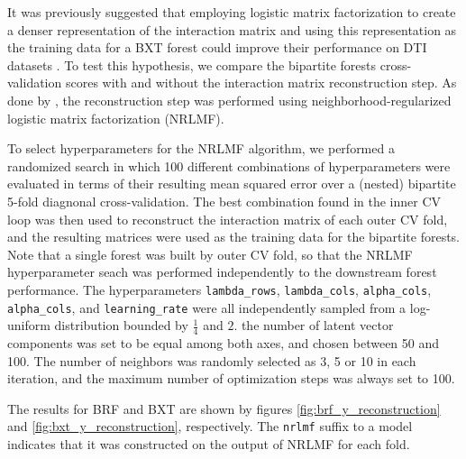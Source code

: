 It was previously suggested that employing logistic matrix factorization to create a denser representation of the interaction matrix and using this representation as the training data for a BXT forest could improve their performance on DTI datasets \cite{Pliakos_2020}. To test this hypothesis, we compare the bipartite forests cross-validation scores with and without the interaction matrix reconstruction step. As done by \cite{Pliakos_2020}, the reconstruction step was performed using neighborhood-regularized logistic matrix factorization (NRLMF)\cite{}.

To select hyperparameters for the NRLMF algorithm, we performed a randomized search in which 100 different combinations of hyperparameters were evaluated in terms of their resulting mean squared error over a (nested) bipartite 5-fold diagnonal cross-validation. The best combination found in the inner CV loop was then used to reconstruct the interaction matrix of each outer CV fold, and the resulting matrices were used as the training data for the bipartite forests. Note that a single forest was built by outer CV fold, so that the NRLMF hyperparameter seach was performed independently to the downstream forest performance. The hyperparameters \texttt{lambda\_rows}, \texttt{lambda\_cols}, \texttt{alpha\_cols}, \texttt{alpha\_cols}, and \texttt{learning\_rate} were all independently sampled from a log-uniform distribution bounded by $\frac{1}{4}$ and $2$. the number of latent vector components was set to be equal among both axes, and chosen between 50 and 100. The number of neighbors was randomly selected as 3, 5 or 10 in each iteration, and the maximum number of optimization steps was always set to 100.  %

The results for BRF and BXT are shown by figures \ref{fig:brf_y_reconstruction} and \ref{fig:bxt_y_reconstruction}, respectively. The \texttt{nrlmf} suffix to a model indicates that it was constructed on the output of NRLMF for each fold.

